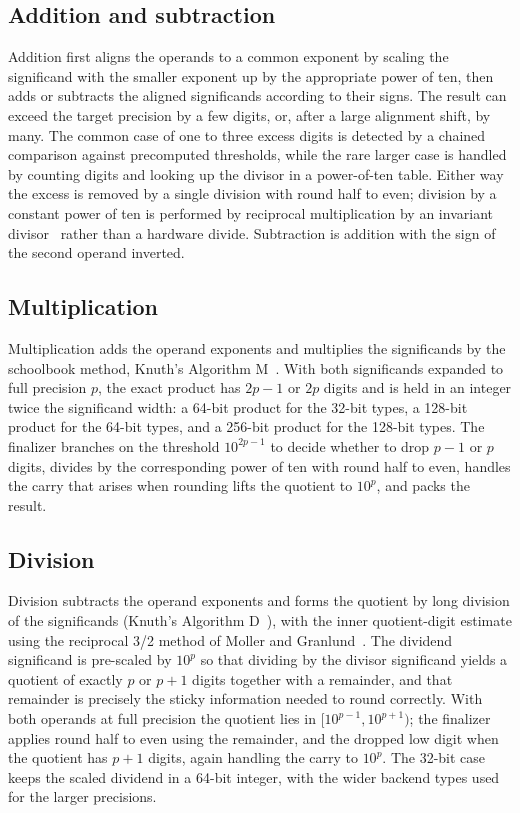 \documentclass[acmsmall]{acmart}
\begin{document}
\subsection{Addition and subtraction}
Addition first aligns the operands to a common exponent by scaling the significand with
the smaller exponent up by the appropriate power of ten, then adds or subtracts the
aligned significands according to their signs. The result can exceed the target
precision by a few digits, or, after a large alignment shift, by many. The common case
of one to three excess digits is detected by a chained comparison against precomputed
thresholds, while the rare larger case is handled by counting digits and looking up the
divisor in a power-of-ten table. Either way the excess is removed by a single division
with round half to even; division by a constant power of ten is performed by reciprocal
multiplication by an invariant divisor~\cite{granlund_montgomery1994, warren_hd} rather
than a hardware divide. Subtraction is addition with the sign of the second operand
inverted.

\subsection{Multiplication}
Multiplication adds the operand exponents and multiplies the significands by the
schoolbook method, Knuth's Algorithm M~\cite{knuth_taocp2}. With both
significands expanded to full precision $p$, the exact product has $2p-1$ or $2p$
digits and is held in an integer twice the significand width: a 64-bit product for the
32-bit types, a 128-bit product for the 64-bit types, and a 256-bit product for the
128-bit types. The finalizer branches on the threshold $10^{2p-1}$ to decide whether to
drop $p-1$ or $p$ digits, divides by the corresponding power of ten with round half to
even, handles the carry that arises when rounding lifts the quotient to $10^{p}$, and
packs the result.

\subsection{Division}
Division subtracts the operand exponents and forms the quotient by long division of the
significands (Knuth's Algorithm D~\cite{knuth_taocp2}), with the inner quotient-digit
estimate using the reciprocal 3/2 method of Moller and Granlund~\cite{moller_granlund2011}.
The dividend significand is pre-scaled by $10^{p}$ so that dividing by the
divisor significand yields a quotient of exactly $p$ or $p+1$ digits together with a
remainder, and that remainder is precisely the sticky information needed to round
correctly. With both operands at full precision the quotient lies in
$[10^{p-1}, 10^{p+1})$; the finalizer applies round half to even using the remainder,
and the dropped low digit when the quotient has $p+1$ digits, again handling the carry
to $10^{p}$. The 32-bit case keeps the scaled dividend in a 64-bit integer, with the
wider backend types used for the larger precisions.
\end{document}
